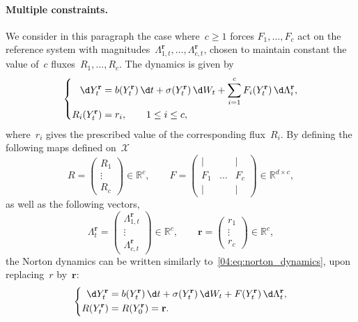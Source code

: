     \paragraph{Multiple constraints.}
    We consider in this paragraph the case where~$c\geq 1$ forces $F_1,\dots,F_c$ act on the reference system with magnitudes~$\Lambda_{1,t}^{\mathbf{r}},\dots,\Lambda_{c,t}^{\mathbf{r}}$, chosen to maintain constant the value of~$c$ fluxes~$R_1,\dots,R_c$. The dynamics is given by
    \[\left\{\begin{aligned}\d Y_t^{\mathbf r} &= b(Y_t^{\mathbf r})\,\d t + \sigma(Y_t^{\mathbf r})\,\d W_t + \sum_{i=1}^c F_i(Y_t^{\mathbf r})\,\d \Lambda_i^{\mathbf r},\\ R_i(Y_t^{\mathbf r}) &= r_i,\qquad 1\leq i \leq c,\end{aligned}\right.\]
    where~$r_i$ gives the prescribed value of the corresponding flux~$R_i$.
    By defining the following maps defined on~$\mathcal X$
    \[R = \begin{pmatrix}R_1\\\vdots\\R_c\end{pmatrix} \in\mathbb{R}^c,\qquad F = \begin{pmatrix}|&  & |\\ F_1 & \dots & F_c \\ | &  & |\end{pmatrix}\in \mathbb{R}^{d\times c},\]
    as well as the following vectors,
    \[\Lambda_t^{\mathbf r}=\begin{pmatrix}\Lambda_{1,t}^{\mathbf r} \\ \vdots \\ \Lambda_{c,t}^{\mathbf r}\end{pmatrix}\in \mathbb{R}^{c},\qquad \mathbf{r}=\begin{pmatrix} r_1 \\ \vdots \\ r_c\end{pmatrix}\in\mathbb{R}^c,\]
    the Norton dynamics can be written similarly to~\eqref{04:eq:norton_dynamics}, upon replacing~$r$ by~$\mathbf{r}$:
    \begin{equation}
    \label{04:eq:norton_dynamics_rvec}
    \left\{\begin{aligned}
    \d Y^{\mathbf r}_t &= b(Y^{\mathbf r}_t)\, \d t + \sigma(Y^{\mathbf r}_t)\, \d W_t +  F(Y^{\mathbf r}_t)\,\d\Lambda^{\mathbf r}_t,\\
    R(Y^{\mathbf r}_t) &= R(Y^{\mathbf r}_0)=\mathbf{r}.
    \end{aligned}\right.
\end{equation}
